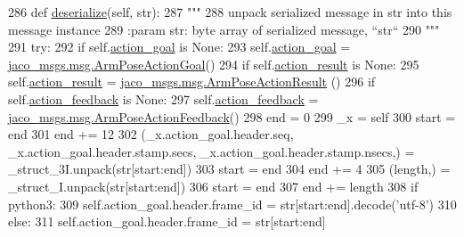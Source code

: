 \begin{DoxyCode}
286   \textcolor{keyword}{def }\hyperlink{classjaco__msgs_1_1msg_1_1__ArmPoseAction_1_1ArmPoseAction_a15aec4f7f7b31cd323152ca28eb8c0d6}{deserialize}(self, str):
287     \textcolor{stringliteral}{"""}
288 \textcolor{stringliteral}{    unpack serialized message in str into this message instance}
289 \textcolor{stringliteral}{    :param str: byte array of serialized message, ``str``}
290 \textcolor{stringliteral}{    """}
291     \textcolor{keywordflow}{try}:
292       \textcolor{keywordflow}{if} self.\hyperlink{classjaco__msgs_1_1msg_1_1__ArmPoseAction_1_1ArmPoseAction_ababc0bb07c8926c3e8d55dfd2ddacdf4}{action\_goal} \textcolor{keywordflow}{is} \textcolor{keywordtype}{None}:
293         self.\hyperlink{classjaco__msgs_1_1msg_1_1__ArmPoseAction_1_1ArmPoseAction_ababc0bb07c8926c3e8d55dfd2ddacdf4}{action\_goal} = \hyperlink{classjaco__msgs_1_1msg_1_1__ArmPoseActionGoal_1_1ArmPoseActionGoal}{jaco\_msgs.msg.ArmPoseActionGoal}()
294       \textcolor{keywordflow}{if} self.\hyperlink{classjaco__msgs_1_1msg_1_1__ArmPoseAction_1_1ArmPoseAction_a15c3aa8e8baead8d23478de23af61ca0}{action\_result} \textcolor{keywordflow}{is} \textcolor{keywordtype}{None}:
295         self.\hyperlink{classjaco__msgs_1_1msg_1_1__ArmPoseAction_1_1ArmPoseAction_a15c3aa8e8baead8d23478de23af61ca0}{action\_result} = \hyperlink{classjaco__msgs_1_1msg_1_1__ArmPoseActionResult_1_1ArmPoseActionResult}{jaco\_msgs.msg.ArmPoseActionResult}
      ()
296       \textcolor{keywordflow}{if} self.\hyperlink{classjaco__msgs_1_1msg_1_1__ArmPoseAction_1_1ArmPoseAction_a4e1fca881430990eb71fe999027640aa}{action\_feedback} \textcolor{keywordflow}{is} \textcolor{keywordtype}{None}:
297         self.\hyperlink{classjaco__msgs_1_1msg_1_1__ArmPoseAction_1_1ArmPoseAction_a4e1fca881430990eb71fe999027640aa}{action\_feedback} = 
      \hyperlink{classjaco__msgs_1_1msg_1_1__ArmPoseActionFeedback_1_1ArmPoseActionFeedback}{jaco\_msgs.msg.ArmPoseActionFeedback}()
298       end = 0
299       \_x = self
300       start = end
301       end += 12
302       (\_x.action\_goal.header.seq, \_x.action\_goal.header.stamp.secs, \_x.action\_goal.header.stamp.nsecs,) = 
      \_struct\_3I.unpack(str[start:end])
303       start = end
304       end += 4
305       (length,) = \_struct\_I.unpack(str[start:end])
306       start = end
307       end += length
308       \textcolor{keywordflow}{if} python3:
309         self.action\_goal.header.frame\_id = str[start:end].decode(\textcolor{stringliteral}{'utf-8'})
310       \textcolor{keywordflow}{else}:
311         self.action\_goal.header.frame\_id = str[start:end]

\end{DoxyCode}
